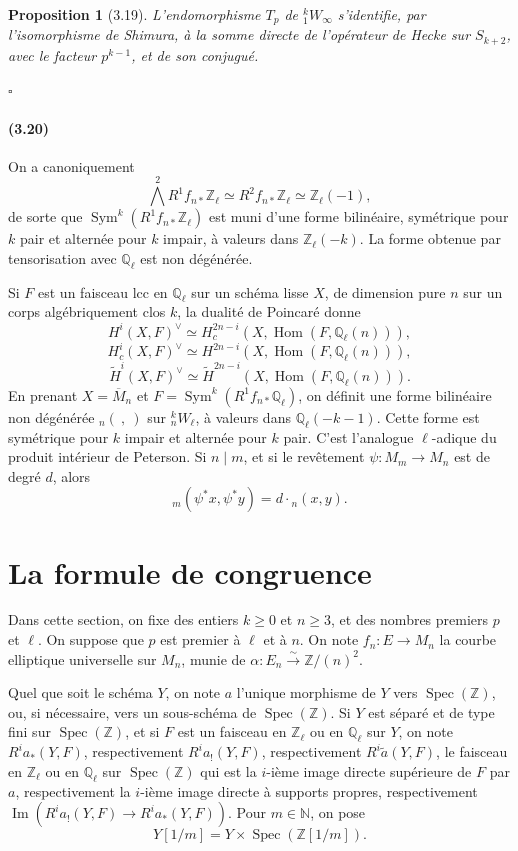 \documentclass[10pt]{article}
\newcommand{\Q}{\mathbb Q}
\newcommand{\Z}{\mathbb Z}
\newcommand{\Hom}{\operatorname{Hom}}
\newcommand{\Spec}{\operatorname{Spec}}
\newcommand{\Sym}{\operatorname{Sym}}
\newcommand{\Imop}{\operatorname{Im}}
\newcommand{\QED}{\hfill$\square$}
\newtheorem*{proposition}{Proposition}
\begin{document}
\begin{proposition}[3.19]
L'endomorphisme $T_p$ de ${}^k_1W_\infty$ s'identifie, par l'isomorphisme de Shimura, à la somme directe de l'opérateur de Hecke sur $S_{k+2}$, avec le facteur $p^{k-1}$, et de son conjugué.
\end{proposition}
\QED

\paragraph{(3.20)}
On a canoniquement
\[
\bigwedge^2R^1f_{n*}\Z_\ell\simeq R^2f_{n*}\Z_\ell\simeq \Z_\ell(-1),
\]
de sorte que $\Sym^k(R^1f_{n*}\Z_\ell)$ est muni d'une forme bilinéaire, symétrique pour $k$ pair et alternée pour $k$ impair, à valeurs dans $\Z_\ell(-k)$. La forme obtenue par tensorisation avec $\Q_\ell$ est non dégénérée.

Si $F$ est un faisceau lcc en $\Q_\ell$ sur un schéma lisse $X$, de dimension pure $n$ sur un corps algébriquement clos $k$, la dualité de Poincaré donne
\[
H^i(X,F)^\vee\simeq H_c^{2n-i}(X,\Hom(F,\Q_\ell(n))),
\]
\[
H_c^i(X,F)^\vee\simeq H^{2n-i}(X,\Hom(F,\Q_\ell(n))),
\]
\[
\widetilde H^i(X,F)^\vee\simeq \widetilde H^{2n-i}(X,\Hom(F,\Q_\ell(n))).
\]
En prenant $X=\overline M_n$ et $F=\Sym^k(R^1f_{n*}\Q_\ell)$, on définit une forme bilinéaire non dégénérée ${}_n(\ ,\ )$ sur ${}^k_nW_\ell$, à valeurs dans $\Q_\ell(-k-1)$. Cette forme est symétrique pour $k$ impair et alternée pour $k$ pair. C'est l'analogue $\ell$-adique du produit intérieur de Peterson. Si $n\mid m$, et si le revêtement $\psi:M_m\to M_n$ est de degré $d$, alors
\[
{}_m(\psi^*x,\psi^*y)=d\cdot {}_n(x,y).
\]

\section{La formule de congruence}

Dans cette section, on fixe des entiers $k\geq 0$ et $n\geq 3$, et des nombres premiers $p$ et $\ell$. On suppose que $p$ est premier à $\ell$ et à $n$. On note $f_n:E\to M_n$ la courbe elliptique universelle sur $M_n$, munie de $\alpha:E_n\xrightarrow{\sim}\Z/(n)^2$.

Quel que soit le schéma $Y$, on note $a$ l'unique morphisme de $Y$ vers $\Spec(\Z)$, ou, si nécessaire, vers un sous-schéma de $\Spec(\Z)$. Si $Y$ est séparé et de type fini sur $\Spec(\Z)$, et si $F$ est un faisceau en $\Z_\ell$ ou en $\Q_\ell$ sur $Y$, on note $R^ia_*(Y,F)$, respectivement $R^ia_!(Y,F)$, respectivement $R^i\widetilde a(Y,F)$, le faisceau en $\Z_\ell$ ou en $\Q_\ell$ sur $\Spec(\Z)$ qui est la $i$-ième image directe supérieure de $F$ par $a$, respectivement la $i$-ième image directe à supports propres, respectivement $\Imop(R^ia_!(Y,F)\to R^ia_*(Y,F))$. Pour $m\in\mathbb N$, on pose
\[
Y[1/m]=Y\times\Spec(\Z[1/m]).
\]
\end{document}
